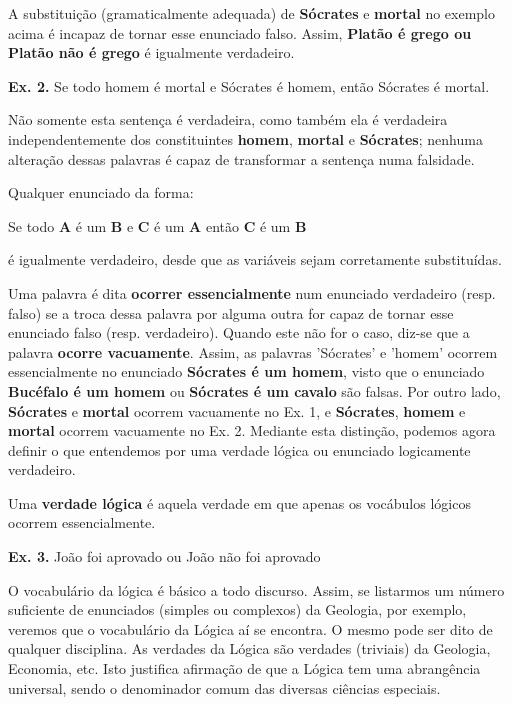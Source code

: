 \documentclass[
	14pt,				%
	twoside,			%
	a4paper,			%
	english,			%
	french,				%
	spanish,			%
	brazil,				%
    ]{abntex2}
\begin{document}
\bigskip
\noindent
A substituição (gramaticalmente adequada) de \textbf{Sócrates} e \textbf{mortal} no exemplo acima é incapaz de tornar esse enunciado falso.
Assim, \textbf{Platão é grego ou Platão não é grego} é igualmente verdadeiro.

\bigskip
\noindent
\textbf{Ex. 2.} Se todo homem é mortal e Sócrates é homem, então Sócrates é mortal.

\bigskip
\noindent
Não somente esta sentença é verdadeira, como também ela é verdadeira independentemente dos constituintes \textbf{homem}, \textbf{mortal} e \textbf{Sócrates}; nenhuma alteração dessas palavras é capaz de transformar a sentença numa falsidade.
\newpage

\noindent Qualquer enunciado da forma:

Se todo \textbf{A} é um \textbf{B} e \textbf{C} é um \textbf{A} então \textbf{C} é um \textbf{B}

\noindent é igualmente verdadeiro, desde que as variáveis sejam corretamente substituídas.

Uma palavra é dita \textbf{ocorrer essencialmente} num enunciado verdadeiro (resp. falso) se a troca dessa palavra por alguma outra for capaz de tornar esse enunciado falso (resp. verdadeiro).
Quando este não for o caso, diz-se que a palavra \textbf{ocorre vacuamente}.
Assim, as palavras 'Sócrates' e 'homem' ocorrem essencialmente no enunciado \textbf{Sócrates é um homem}, visto que o enunciado \textbf{Bucéfalo é um homem} ou \textbf{Sócrates é um cavalo} são falsas.
Por outro lado, \textbf{Sócrates} e \textbf{mortal} ocorrem vacuamente no Ex. 1, e \textbf{Sócrates}, \textbf{homem} e \textbf{mortal} ocorrem vacuamente no Ex. 2.
Mediante esta distinção, podemos agora definir o que entendemos por uma verdade lógica ou enunciado logicamente verdadeiro.

Uma \textbf{verdade lógica} é aquela verdade em que apenas os vocábulos lógicos ocorrem essencialmente.

\noindent \textbf{Ex. 3.} João foi aprovado ou João não foi aprovado

O vocabulário da lógica é básico a todo discurso.
Assim, se listarmos um número suficiente de enunciados (simples ou complexos) da Geologia, por exemplo, veremos que o vocabulário da Lógica aí se encontra.
O mesmo pode ser dito de qualquer disciplina.
As verdades da Lógica são verdades (triviais) da Geologia, Economia, etc.
Isto justifica afirmação de que a Lógica tem uma abrangência universal, sendo o denominador comum das diversas ciências especiais.
\end{document}
